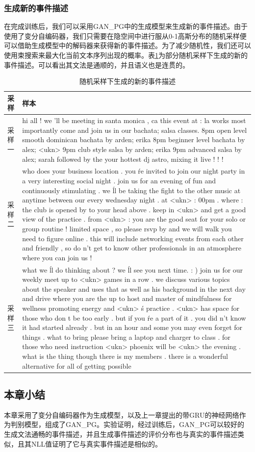 \documentclass[]{template}
\begin{document}
\subsubsection{生成新的事件描述}
在完成训练后，我们可以采用GAN\_PG中的生成模型来生成新的事件描述。由于使用了变分自编码器，我们只需要在隐空间中进行服从0-1高斯分布的随机采样便可以借助生成模型中的解码器来获得新的事件描述。为了减少随机性，我们还可以使用束搜索来最大化当前文本序列出现的概率。表\ref{t3-4}为部分随机采样下生成的新的事件描述。可以看出其文法是通顺的，并且语义也是连贯的。
\begin{table}[htb]
    \centering
    \caption{\label{t3-4}随机采样下生成的新的事件描述}
    \begin{tabular*}{\linewidth}{p{.1\linewidth}p{.85\linewidth}}
\toprule
采样&样本\\
\midrule
采样一&hi all ! we 'll be meeting in santa monica , ca this event at : la works most importantly come and join us in our bachata; salsa classes. 8pm open level smooth dominican bachata by arden; erika 8pm beginner level bachata by alex; <ukn> 9pm club style salsa by arden; erika 9pm advanced salsa by alex; sarah followed by the your hottest dj astro, mixing it live ! ! ! \\
采样二 & who does your business location . you \'re invited to join our night party in a very interesting social night . join us for an evening of fun and continuously stimulating . we \'ll be taking the fight to the other music at anytime between our every wednesday night . at <ukn> : 00pm . where : the club is opened by to your head above . keep in <ukn> and get a good view of the practice . from <ukn> : you are the good seat for your solo or group routine ! limited space , so please rsvp by and we will walk you need to figure online . this will include networking events from each other and friendly , so do n't get to know other professionals in an atmosphere where you can join us ! \\
采样三& what we \'ll do thinking about ? we \'ll see you next time. : ) join us for our weekly meet up to <ukn> games in a row . we discuss various topics about the speaker and uses that as well as his background in the next day and drive where you are the up to host and master of mindfulness for wellness promoting energy and <ukn> \'s practice . <ukn> has space for those who don t be too early . but if you \'re a part of it . you did n't know it had started already . but in an hour and some you may even forget for things . what to bring please bring a laptop and charger to class . for those who need instruction <ukn> phoenix will be <ukn> the evening . what is the thing though there is my members . there is a wonderful alternative for all of getting possible  \\
\bottomrule 
    \end{tabular*}
\end{table}
\subsection{本章小结}
本章采用了变分自编码器作为生成模型，以及上一章提出的带GRU的神经网络作为判别模型，组成了GAN\_PG。实验证明，经过训练后，GAN\_PG可以较好的生成文法通畅的事件描述，并且生成事件描述的评价分布也与真实的事件描述类似，且其NLL值证明了它与真实事件描述是相似的。
\end{document}
